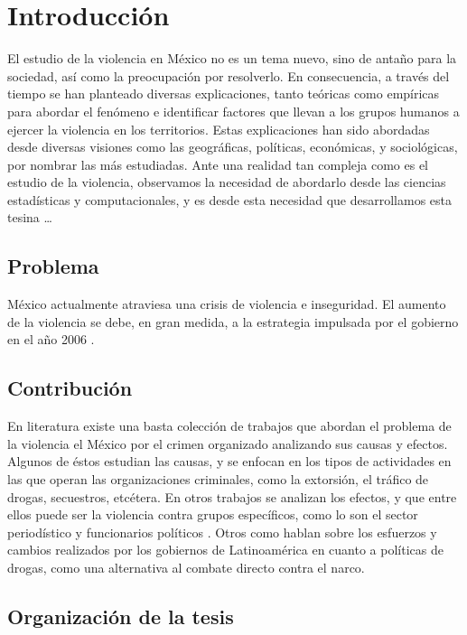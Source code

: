 \chapter{Introducción}

El estudio de la violencia en México no es un tema nuevo, sino de antaño para la sociedad, así como la preocupación por resolverlo. En consecuencia, a través del tiempo se han planteado diversas explicaciones, tanto teóricas como empíricas para abordar el fenómeno e identificar factores que llevan a los grupos humanos a ejercer la violencia en los territorios. Estas explicaciones han sido abordadas desde diversas visiones como  las geográficas, políticas, económicas, y sociológicas, por nombrar las más estudiadas. Ante una realidad tan compleja como es el estudio de la violencia, observamos la necesidad de abordarlo desde las ciencias estadísticas y computacionales, y es desde esta necesidad que desarrollamos esta tesina \ldots


\section{Problema} \label{sec:problem}

México actualmente atraviesa una crisis de violencia e inseguridad. El aumento de la violencia se debe, en gran medida, a la estrategia impulsada por el gobierno en el año 2006 \citep{Atuesta2017}.



\section{Contribución} \label{sec:contribution}

En literatura existe una basta colección de trabajos que abordan el problema de la violencia el México por el crimen organizado analizando sus causas y efectos. Algunos de éstos estudian las causas, y se enfocan en los tipos de actividades en las que operan las organizaciones criminales, como la extorsión, el tráfico de drogas, secuestros, etcétera. En otros trabajos se analizan los efectos, y que entre ellos puede ser la violencia contra grupos específicos, como lo son el sector periodístico y funcionarios políticos \citep{Rios2012tendencias}. Otros como \citet{Youngers2014} hablan sobre los esfuerzos y cambios realizados por los gobiernos de Latinoamérica en cuanto a políticas de drogas, como una alternativa al combate directo contra el narco.

\section{Organización de la tesis}






